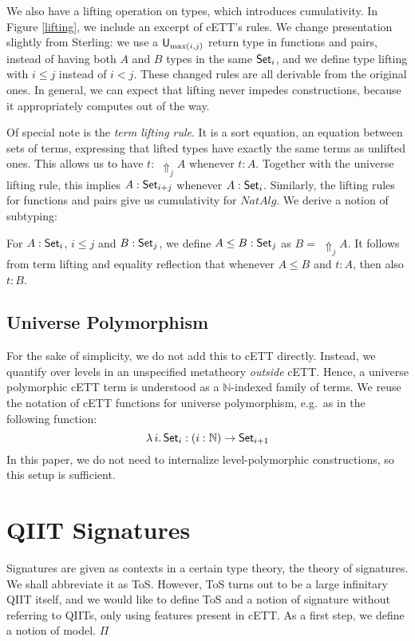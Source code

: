 \documentclass[sigplan,review,anonymous]{acmart}\settopmatter{printfolios=true,printccs=false,printacmref=false}
\newcommand{\Lift}{\Uparrow}
\begin{document}
We also have a lifting operation on types, which introduces cumulativity. In
Figure \ref{lifting}, we include an excerpt of cETT's rules. We change
presentation slightly from Sterling: we use a $\mathsf{U}_{\max(i,j)}$ return type in
functions and pairs, instead of having both $A$ and $B$ types in the same
$\mathsf{Set}_i$, and we define type lifting with $i \leq j$ instead of $i < j$. These
changed rules are all derivable from the original ones. In general, we can
expect that lifting never impedes constructions, because it appropriately
computes out of the way.

Of special note is the \emph{term lifting rule}. It is a sort equation, an
equation between sets of terms, expressing that lifted types have exactly the
same terms as unlifted ones. This allows us to have $t :\,\,\Lift_j A$ whenever $t
: A$. Together with the universe lifting rule, this implies $A : \mathsf{Set}_{i+j}$
whenever $A : \mathsf{Set}_i$. Similarly, the lifting rules for functions and pairs give
us cumulativity for $NatAlg$. We derive a notion of subtyping:

\begin{definition}
  For $A : \mathsf{Set}_i$, $i \leq j$ and $B : \mathsf{Set}_{j}$, we define $A \leq B : \mathsf{Set}_{j}$
  as $B =\,\,\Lift_j A$.  It follows from term lifting and equality reflection
  that whenever $A \leq B$ and $t : A$, then also $t : B$.
\end{definition}

\subsection{Universe Polymorphism}
\label{sec:universe_polymorphism}

For the sake of simplicity, we do not add this to cETT directly. Instead, we
quantify over levels in an unspecified metatheory \emph{outside} cETT. Hence, a
universe polymorphic cETT term is understood as a $\mathbb{N}$-indexed family of
terms. We reuse the notation of cETT functions for universe polymorphism, e.g.\ as
in the following function:
\[
\lambda\,i.\,\mathsf{Set}_i : (i : \mathbb{N})\rightarrow \mathsf{Set}_{i+1}
\]
In this paper, we do not need to internalize level-polymorphic constructions,
so this setup is sufficient.

\section{QIIT Signatures}
\label{sec:tos}

Signatures are given as contexts in a certain type theory, the theory of
signatures. We shall abbreviate it as ToS. However, ToS turns out to be a large
infinitary QIIT itself, and we would like to define ToS and a notion of
signature without referring to QIITs, only using features present in cETT. As a
first step, we define a notion of model. $\Pi$
\end{document}
